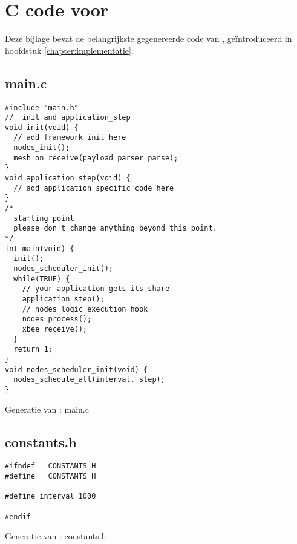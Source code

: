 
\chapter{C code voor }
\label{appendix:hello-srcs}

Deze bijlage bevat de belangrijkste gegenereerde code van ,
ge\"introduceerd in hoofdstuk \ref{chapter:implementatie}.

\section{main.c}
\vspace{-5mm}
\begin{listing}[H]
  \begin{verbatim}
#include "main.h"
//  init and application_step
void init(void) {
  // add framework init here
  nodes_init();
  mesh_on_receive(payload_parser_parse);
}
void application_step(void) {
  // add application specific code here
}
/*
  starting point
  please don't change anything beyond this point.
*/
int main(void) {
  init();
  nodes_scheduler_init();
  while(TRUE) {
    // your application gets its share
    application_step();
    // nodes logic execution hook
    nodes_process();
    xbee_receive();
  }
  return 1;
}
void nodes_scheduler_init(void) {
  nodes_schedule_all(interval, step);
}
  \end{verbatim}
  \vspace{-5mm}
  \caption{Generatie van : main.c}
\end{listing}

\section{constants.h}
\vspace{-5mm}
\begin{listing}[H]
  \begin{verbatim}
#ifndef __CONSTANTS_H
#define __CONSTANTS_H

#define interval 1000

#endif
  \end{verbatim}
  \vspace{-5mm}
  \caption{Generatie van : constants.h}
\end{listing}

